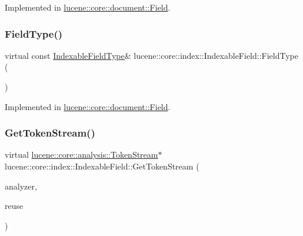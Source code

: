 Implemented in \mbox{\hyperlink{classlucene_1_1core_1_1document_1_1Field_a5415bfa7681238c59d6e0acb2da13bd4}{lucene\+::core\+::document\+::\+Field}}.

\mbox{\label{classlucene_1_1core_1_1index_1_1IndexableField_a008a8b0a96618b1600ad2b44e9357451}} 
\subsubsection{\texorpdfstring{Field\+Type()}{FieldType()}}
{\footnotesize\ttfamily virtual const \mbox{\hyperlink{classlucene_1_1core_1_1index_1_1IndexableFieldType}{Indexable\+Field\+Type}}\& lucene\+::core\+::index\+::\+Indexable\+Field\+::\+Field\+Type (\begin{DoxyParamCaption}{ }\end{DoxyParamCaption})\hspace{0.3cm}{\ttfamily [pure virtual]}}



Implemented in \mbox{\hyperlink{classlucene_1_1core_1_1document_1_1Field_ab6ffe62bb06b157049af54cd2b674007}{lucene\+::core\+::document\+::\+Field}}.

\mbox{\label{classlucene_1_1core_1_1index_1_1IndexableField_a9df5c2708bdb7936a7e070ee9866ee27}} 
\subsubsection{\texorpdfstring{Get\+Token\+Stream()}{GetTokenStream()}}
{\footnotesize\ttfamily virtual \mbox{\hyperlink{classlucene_1_1core_1_1analysis_1_1TokenStream}{lucene\+::core\+::analysis\+::\+Token\+Stream}}$\ast$ lucene\+::core\+::index\+::\+Indexable\+Field\+::\+Get\+Token\+Stream (\begin{DoxyParamCaption}\item[{\mbox{\hyperlink{classlucene_1_1core_1_1analysis_1_1Analyzer}{lucene\+::core\+::analysis\+::\+Analyzer}} \&}]{analyzer,  }\item[{\mbox{\hyperlink{classlucene_1_1core_1_1analysis_1_1TokenStream}{lucene\+::core\+::analysis\+::\+Token\+Stream}} \&}]{reuse }\end{DoxyParamCaption})\hspace{0.3cm}{\ttfamily [pure virtual]}}



